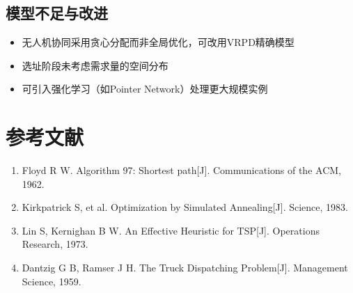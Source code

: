 \documentclass[12pt,a4paper]{ctexart}
\begin{document}
\subsection{模型不足与改进}
\begin{itemize}
    \item 无人机协同采用贪心分配而非全局优化，可改用VRPD精确模型
    \item 选址阶段未考虑需求量的空间分布
    \item 可引入强化学习（如Pointer Network）处理更大规模实例
\end{itemize}

\section{参考文献}
\begin{enumerate}
    \item Floyd R W. Algorithm 97: Shortest path[J]. Communications of the ACM, 1962.
    \item Kirkpatrick S, et al. Optimization by Simulated Annealing[J]. Science, 1983.
    \item Lin S, Kernighan B W. An Effective Heuristic for TSP[J]. Operations Research, 1973.
    \item Dantzig G B, Ramser J H. The Truck Dispatching Problem[J]. Management Science, 1959.
\end{enumerate}
\end{document}
